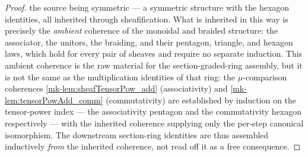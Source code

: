 \begin{proof}
  \leanok
  the source being symmetric --- a symmetric structure with the hexagon
  identities, all inherited through sheafification. What is inherited in this way
  is precisely the \emph{ambient} coherence of the monoidal and braided structure:
  the associator, the unitors, the braiding, and their pentagon, triangle, and
  hexagon laws, which hold for every pair of sheaves and require no separate
  induction. This ambient coherence is the raw material for the section-graded-ring
  assembly, but it is not the same as the multiplication identities of that ring:
  the \(\mu\)-comparison coherences \ref{mk-lem:sheafTensorPow_add} (associativity)
  and \ref{mk-lem:tensorPowAdd_comm} (commutativity) are established by induction on
  the tensor-power index --- the associativity pentagon and the commutativity
  hexagon respectively --- with the inherited coherence supplying only the
  per-step canonical isomorphism. The downstream section-ring identities are thus
  assembled inductively \emph{from} the inherited coherence, not read off it as a
  free consequence.
\end{proof}

